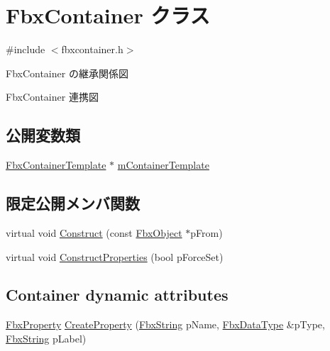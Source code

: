 \hypertarget{class_fbx_container}{}\section{Fbx\+Container クラス}
\label{class_fbx_container}


{\ttfamily \#include $<$fbxcontainer.\+h$>$}



Fbx\+Container の継承関係図


Fbx\+Container 連携図
\subsection*{公開変数類}
\begin{DoxyCompactItemize}
\item 
\hyperlink{class_fbx_container_template}{Fbx\+Container\+Template} $\ast$ \hyperlink{class_fbx_container_ade609786f173965289c16e2537927bd8}{m\+Container\+Template}
\end{DoxyCompactItemize}
\subsection*{限定公開メンバ関数}
\begin{DoxyCompactItemize}
\item 
virtual void \hyperlink{class_fbx_container_a65204439a64fd2184467e41d994bec0a}{Construct} (const \hyperlink{class_fbx_object}{Fbx\+Object} $\ast$p\+From)
\item 
virtual void \hyperlink{class_fbx_container_a27222c85d2076c036d1596c25cbc9cd0}{Construct\+Properties} (bool p\+Force\+Set)
\end{DoxyCompactItemize}
\subsection*{Container dynamic attributes}
\begin{DoxyCompactItemize}
\item 
\hyperlink{class_fbx_property}{Fbx\+Property} \hyperlink{class_fbx_container_aba24a2e2319b0111980eb198f8e726b1}{Create\+Property} (\hyperlink{class_fbx_string}{Fbx\+String} p\+Name, \hyperlink{class_fbx_data_type}{Fbx\+Data\+Type} \&p\+Type, \hyperlink{class_fbx_string}{Fbx\+String} p\+Label)
\end{DoxyCompactItemize}
